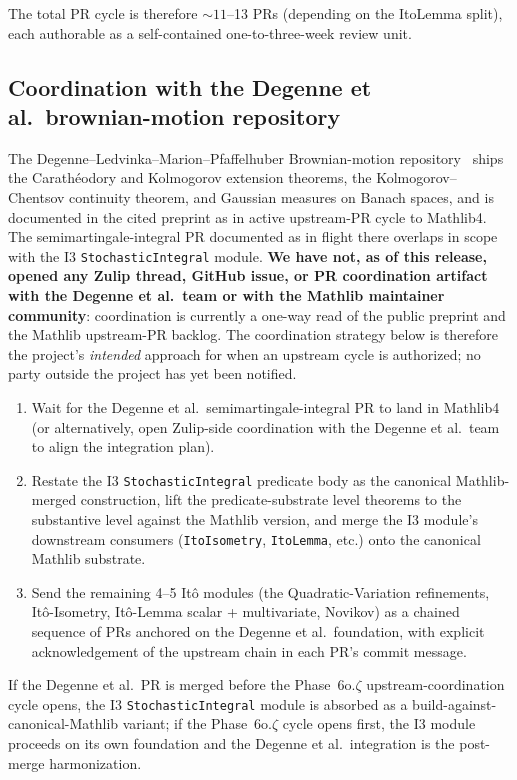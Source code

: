 \documentclass[11pt]{article}
\begin{document}
The total PR cycle is therefore $\sim 11$--13 PRs (depending on the
ItoLemma split), each authorable as a self-contained one-to-three-week
review unit.

\subsection{Coordination with the Degenne et al.\ brownian-motion repository}

The Degenne--Ledvinka--Marion--Pfaffelhuber Brownian-motion
repository~\cite{Degenne2025BrownianMotion} ships the
Carath\'eodory and Kolmogorov extension theorems, the
Kolmogorov--Chentsov continuity theorem, and Gaussian measures on
Banach spaces, and is documented in the cited preprint as in
active upstream-PR cycle to Mathlib4. The semimartingale-integral
PR documented as in flight there overlaps in scope with the I3
\texttt{StochasticIntegral} module. \textbf{We have not, as of
this release, opened any Zulip thread, GitHub issue, or PR
coordination artifact with the Degenne et al.\ team or with the
Mathlib maintainer community}: coordination is currently a
one-way read of the public preprint and the Mathlib upstream-PR
backlog. The coordination strategy below is therefore the project's
\emph{intended} approach for when an upstream cycle is authorized;
no party outside the project has yet been notified.

\begin{enumerate}
\item Wait for the Degenne et al.\ semimartingale-integral PR to
  land in Mathlib4 (or alternatively, open Zulip-side coordination
  with the Degenne et al.\ team to align the integration plan).
\item Restate the I3 \texttt{StochasticIntegral} predicate body as
  the canonical Mathlib-merged construction, lift the
  predicate-substrate level theorems to the substantive level
  against the Mathlib version, and merge the I3 module's downstream
  consumers (\texttt{ItoIsometry}, \texttt{ItoLemma}, etc.) onto
  the canonical Mathlib substrate.
\item Send the remaining 4--5 It\^o modules (the
  Quadratic-Variation refinements, It\^o-Isometry, It\^o-Lemma scalar +
  multivariate, Novikov) as a chained sequence of PRs anchored on the
  Degenne et al.\ foundation, with explicit acknowledgement of the
  upstream chain in each PR's commit message.
\end{enumerate}

If the Degenne et al.\ PR is merged before the Phase~6o.$\zeta$
upstream-coordination cycle opens, the I3 \texttt{StochasticIntegral}
module is absorbed as a build-against-canonical-Mathlib variant;
if the Phase~6o.$\zeta$ cycle opens first, the I3 module proceeds
on its own foundation and the Degenne et al.\ integration is the
post-merge harmonization.
\end{document}
